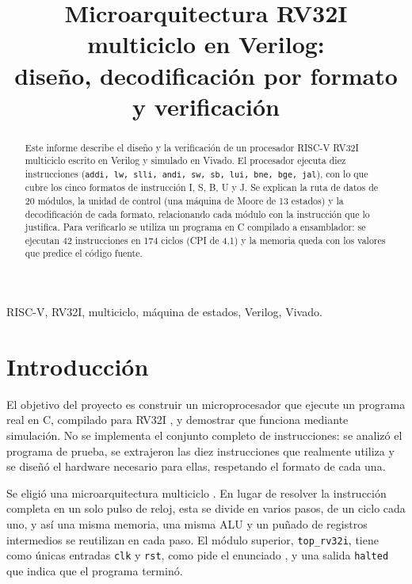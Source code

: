 \documentclass[conference]{IEEEtran}
\newcommand{\cod}[1]{\texttt{\small #1}}
\begin{document}
\title{Microarquitectura RV32I multiciclo en Verilog:\\ diseño, decodificación por formato y verificación}
\author{
}
\maketitle

\begin{abstract}
Este informe describe el diseño y la verificación de un procesador RISC-V RV32I multiciclo escrito en Verilog y simulado en Vivado. El procesador ejecuta diez instrucciones (\cod{addi, lw, slli, andi, sw, sb, lui, bne, bge, jal}), con lo que cubre los cinco formatos de instrucción I, S, B, U y J. Se explican la ruta de datos de 20 módulos, la unidad de control (una máquina de Moore de 13 estados) y la decodificación de cada formato, relacionando cada módulo con la instrucción que lo justifica. Para verificarlo se utiliza un programa en C compilado a ensamblador: se ejecutan 42 instrucciones en 174 ciclos (CPI de 4,1) y la memoria queda con los valores que predice el código fuente.
\end{abstract}
\begin{IEEEkeywords}
RISC-V, RV32I, multiciclo, máquina de estados, Verilog, Vivado.
\end{IEEEkeywords}

\section{Introducción}
El objetivo del proyecto es construir un microprocesador que ejecute un programa real en C, compilado para RV32I \cite{spec}, y demostrar que funciona mediante simulación. No se implementa el conjunto completo de instrucciones: se analizó el programa de prueba, se extrajeron las diez instrucciones que realmente utiliza y se diseñó el hardware necesario para ellas, respetando el formato de cada una.

Se eligió una microarquitectura multiciclo \cite{pat}. En lugar de resolver la instrucción completa en un solo pulso de reloj, esta se divide en varios pasos, de un ciclo cada uno, y así una misma memoria, una misma ALU y un puñado de registros intermedios se reutilizan en cada paso. El módulo superior, \cod{top\_rv32i}, tiene como únicas entradas \cod{clk} y \cod{rst}, como pide el enunciado \cite{enun}, y una salida \cod{halted} que indica que el programa terminó.
\end{document}
